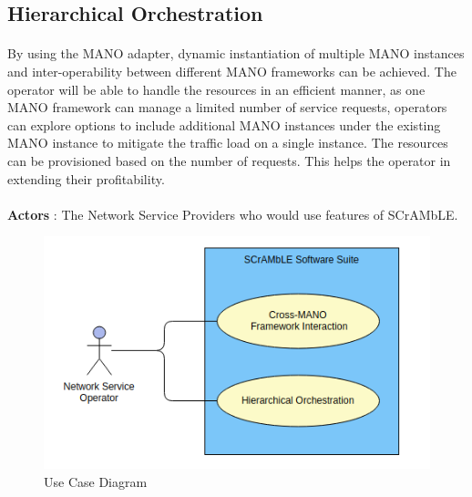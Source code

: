 \subsection{Hierarchical Orchestration}
\paragraph{}
By using the MANO adapter, dynamic instantiation of multiple MANO instances and inter-operability between different MANO frameworks can be achieved. The operator will be able to handle the resources in an efficient manner, as one MANO framework can manage a limited number of service requests, operators can explore options to include additional MANO instances under the existing MANO instance to mitigate the traffic load on a single instance. The resources can be provisioned based on the number of requests. This helps the operator in extending their profitability.
\\
\\
\textbf{Actors} : The Network Service Providers who would use features of SCrAMbLE.

\begin{figure} [h]
	\centering
	\includegraphics[width=0.9\linewidth]{figures/use-case}
	\caption{Use Case Diagram}
	\label{fig:use-case}
\end{figure}





